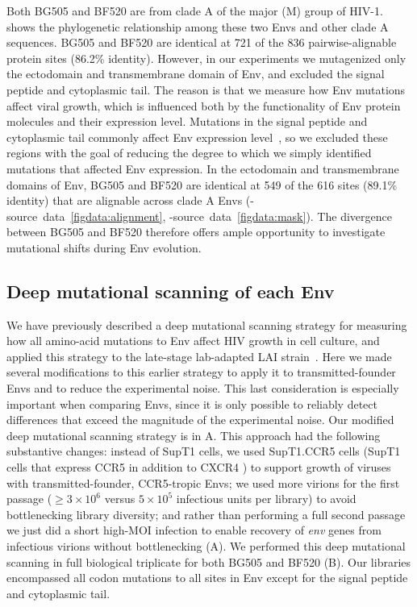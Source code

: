 \documentclass[9pt]{elife}
\begin{document}
Both BG505 and BF520 are from clade A of the major (M) group of HIV-1.
 shows the phylogenetic relationship among these two Envs and other clade A sequences.
BG505 and BF520 are identical at 721 of the 836 pairwise-alignable protein sites (86.2\% identity).
However, in our experiments we mutagenized only the ectodomain and transmembrane domain of Env, and excluded the signal peptide and cytoplasmic tail.
The reason is that we measure how Env mutations affect viral growth, which is influenced both by the functionality of Env protein molecules and their expression level.
Mutations in the signal peptide and cytoplasmic tail commonly affect Env expression level~\citep{chakrabarti1989cytoplasmic,yuste2004modulation,li1994control}, so we excluded these regions with the goal of reducing the degree to which we simply identified mutations that affected Env expression.
In the ectodomain and transmembrane domains of Env, BG505 and BF520 are identical at 549 of the 616 sites (89.1\% identity) that are alignable across clade A Envs (-source~data~\ref{figdata:alignment}, -source~data~\ref{figdata:mask}).
The divergence between BG505 and BF520 therefore offers ample opportunity to investigate mutational shifts during Env evolution.

\subsection{Deep mutational scanning of each Env}
We have previously described a deep mutational scanning strategy for measuring how all amino-acid mutations to Env affect HIV growth in cell culture, and applied this strategy to the late-stage lab-adapted LAI strain~\citep{haddox2016experimental}.
Here we made several modifications to this earlier strategy to apply it to transmitted-founder Envs and to reduce the experimental noise. 
This last consideration is especially important when comparing Envs, since it is only possible to reliably detect differences that exceed the magnitude of the experimental noise. 
Our modified deep mutational scanning strategy is in A.
This approach had the following substantive changes: instead of SupT1 cells, we used SupT1.CCR5 cells (SupT1 cells that express CCR5 in addition to CXCR4 \citep{boyd2015mutations}) to support growth of viruses with transmitted-founder, CCR5-tropic Envs; we used more virions for the first passage ($\ge 3 \times 10^6$ versus $5\times 10^5$ infectious units per library) to avoid bottlenecking library diversity; and rather than performing a full second passage we just did a short high-MOI infection to enable recovery of \textit{env} genes from infectious virions without bottlenecking (A).
We performed this deep mutational scanning in full biological triplicate for both BG505 and BF520 (B).
Our libraries encompassed all codon mutations to all sites in Env except for the signal peptide and cytoplasmic tail.
\end{document}
